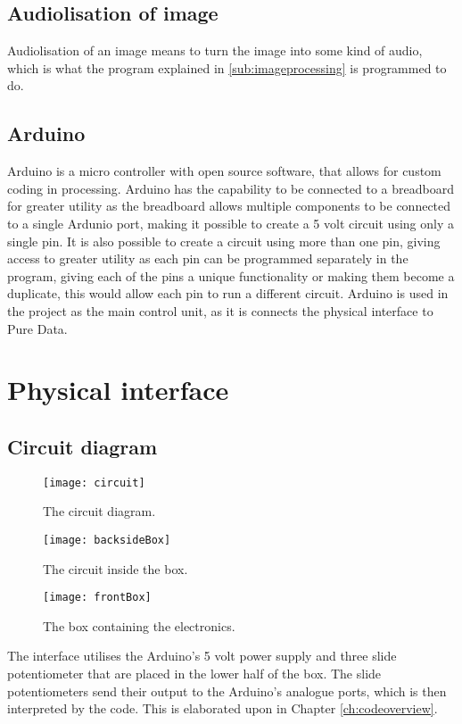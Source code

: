 	\subsection{Audiolisation of image}\label{sub:audiolisationofimage} 
	Audiolisation of an image means to turn the image into some kind of audio, which is what the program explained in \ref{sub:imageprocessing} is programmed to do. 
	
	\subsection{Arduino}\label{sub:arduino}
	Arduino is a micro controller with open source software, that allows for custom coding in processing. Arduino has the capability to be connected to a breadboard for greater utility as the breadboard allows multiple components to be connected to a single Ardunio port, making it possible to create a 5 volt circuit using only a single pin. It is also possible to create a circuit using more than one pin, giving access to greater utility as each pin can be programmed separately in the program, giving each of the pins a unique functionality or making them become a duplicate, this would allow each pin to run a different circuit.
	Arduino is used in the project as the main control unit, as it is connects the physical interface to Pure Data. 
	
\section{Physical interface}\label{sec:physicalinterface}

	
	\subsection{Circuit diagram}\label{sub:circuitdiagram}
\begin{figure}
\centering
\texttt{[image: circuit]}
\caption{The circuit diagram.}
\label{fig:circuit}
\end{figure}

\begin{figure}
\centering
\texttt{[image: backsideBox]}
\caption{The circuit inside the box.}
\label{fig:backsideBox}
\end{figure}

\begin{figure}
\centering
\texttt{[image: frontBox]}
\caption{The box containing the electronics.}
\label{fig:frontBox}
\end{figure}

	
	The interface utilises the Arduino's 5 volt power supply and three slide potentiometer that are placed in the lower half of the box. The slide potentiometers send their output to the Arduino's analogue ports, which is then interpreted by the code. This is elaborated upon in Chapter \ref{ch:codeoverview}.
